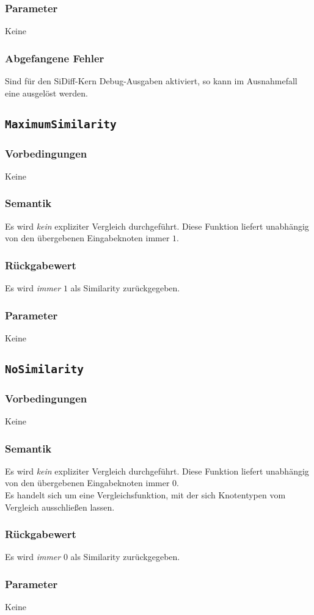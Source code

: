 \subsubsection*{Parameter}
Keine
\subsubsection*{Abgefangene Fehler}
Sind für den SiDiff-Kern Debug-Ausgaben aktiviert, so kann im Ausnahmefall eine\mylinebreak{} ausgelöst werden.


\newpage
%
%
\subsection{\texttt{MaximumSimilarity}}
\subsubsection*{Vorbedingungen}
Keine
\subsubsection*{Semantik}
Es wird \emph{kein} expliziter Vergleich durchgeführt. Diese Funktion liefert unabhängig von den übergebenen Eingabeknoten immer $1$.
\subsubsection*{Rückgabewert}
Es wird \emph{immer} $1$ als Similarity zurückgegeben.
\subsubsection*{Parameter}
Keine


%
%
\subsection{\texttt{NoSimilarity}}
\subsubsection*{Vorbedingungen}
Keine
\subsubsection*{Semantik}
Es wird \emph{kein} expliziter Vergleich durchgeführt. Diese Funktion liefert unabhängig von den übergebenen Eingabeknoten immer $0$.\\
Es handelt sich um eine Vergleichsfunktion, mit der sich Knotentypen vom Vergleich ausschließen lassen.
\subsubsection*{Rückgabewert}
Es wird \emph{immer} $0$ als Similarity zurückgegeben.
\subsubsection*{Parameter}
Keine
